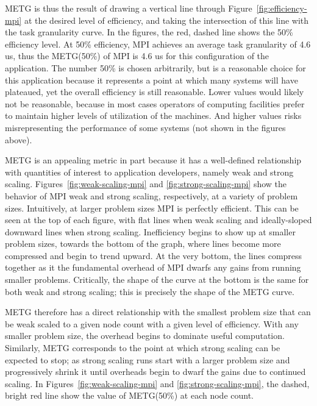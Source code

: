 METG is thus the result of drawing a vertical line through
Figure~\ref{fig:efficiency-mpi} at the desired level of efficiency,
and taking the intersection of this line with the task granularity
curve. In the figures, the red, dashed line shows the 50\% efficiency
level. At 50\% efficiency, MPI achieves an average task granularity of
4.6 us, thus the METG(50\%) of MPI is 4.6 us for this configuration of
the application. The number 50\% is chosen arbitrarily, but is a
reasonable choice for this application because it represents a point
at which many systems will have plateaued, yet the overall efficiency
is still reasonable. Lower values would likely not be reasonable,
because in most cases operators of computing facilities prefer to
maintain higher levels of utilization of the machines. And higher
values risks misrepresenting the performance of some systems (not
shown in the figures above).

METG is an appealing metric in part because it has a well-defined
relationship with quantities of interest to application developers,
namely weak and strong scaling. Figures~\ref{fig:weak-scaling-mpi} and
\ref{fig:strong-scaling-mpi} show the behavior of MPI weak and strong
scaling, respectively, at a variety of problem sizes. Intuitively, at
larger problem sizes MPI is perfectly efficient. This can be seen at
the top of each figure, with flat lines when weak scaling and
ideally-sloped downward lines when strong scaling. Inefficiency begins
to show up at smaller problem sizes, towards the bottom of the graph,
where lines become more compressed and begin to trend upward. At the
very bottom, the lines compress together as it the fundamental
overhead of MPI dwarfs any gains from running smaller
problems. Critically, the shape of the curve at the bottom is the same
for both weak and strong scaling; this is precisely the shape of
the METG curve.




METG therefore has a direct relationship with the smallest problem
size that can be weak scaled to a given node count with a given level
of efficiency. With any smaller problem size, 
the overhead begins to dominate useful
computation. Similarly, METG corresponds to the point at which strong
scaling can be expected to stop; as strong scaling runs start with a
larger problem size and progressively shrink it until overheads begin
to dwarf the gains due to continued scaling. In
Figures~\ref{fig:weak-scaling-mpi} and \ref{fig:strong-scaling-mpi},
the dashed, bright red line show the value of METG(50\%) at each node
count.

